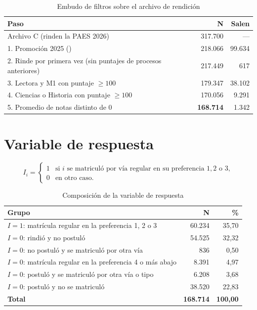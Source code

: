 \documentclass[11pt]{article}
\newif\ifborrador
\newcommand{\redactar}[1]{\ifborrador
  \begin{tcolorbox}[colback=red!4,colframe=red!60!black,fonttitle=\bfseries\small,
    title=Redactar (lo escribe el grupo),breakable,left=4pt,right=4pt,top=1pt,bottom=1pt]
  \small #1\end{tcolorbox}\fi}
\newcommand{\cod}[1]{\texttt{\detokenize{#1}}}
\begin{document}
\begin{table}[H]
\centering
\caption{Embudo de filtros sobre el archivo de rendición}
\label{tab:embudo}
\begin{tabular}{>{\raggedright}p{8cm} r r}
\toprule
\textbf{Paso} & \textbf{N} & \textbf{Salen} \\
\midrule
Archivo C (rinden la PAES 2026) & 317.700 & --- \\
1. Promoción 2025 (\cod{SITUACION_EGRESO == 1}) & 218.066 & 99.634 \\
2. Rinde por primera vez (sin puntajes de procesos anteriores) & 217.449 & 617 \\
3. Lectora y M1 con puntaje $\geq 100$ & 179.347 & 38.102 \\
4. Ciencias o Historia con puntaje $\geq 100$ & 170.056 & 9.291 \\
5. Promedio de notas distinto de 0 & \textbf{168.714} & 1.342 \\
\bottomrule
\end{tabular}
\end{table}

\section{Variable de respuesta}

\redactar{Definir $I$ con palabras y en fórmula: $I = 1$ si el estudiante se matriculó por vía regular (vía 1, tipo 1) en su 1.ª, 2.ª o 3.ª preferencia; $I = 0$ en cualquier otro caso. Comentar la tasa (35,70 \%) y la composición de los ceros (tabla \ref{tab:comp}). Mencionar el chequeo: ningún $I = 1$ tiene \cod{flag_postula = 0}.}

\[
I_i =
\begin{cases}
1 & \text{si } i \text{ se matriculó por vía regular en su preferencia } 1, 2 \text{ o } 3,\\
0 & \text{en otro caso.}
\end{cases}
\]

\begin{table}[H]
\centering
\caption{Composición de la variable de respuesta}
\label{tab:comp}
\begin{tabular}{>{\raggedright}p{9cm} r r}
\toprule
\textbf{Grupo} & \textbf{N} & \textbf{\%} \\
\midrule
$I = 1$: matrícula regular en la preferencia 1, 2 o 3 & 60.234 & 35,70 \\
\midrule
$I = 0$: rindió y no postuló & 54.525 & 32,32 \\
$I = 0$: no postuló y se matriculó por otra vía & 836 & 0,50 \\
$I = 0$: matrícula regular en la preferencia 4 o más abajo & 8.391 & 4,97 \\
$I = 0$: postuló y se matriculó por otra vía o tipo & 6.208 & 3,68 \\
$I = 0$: postuló y no se matriculó & 38.520 & 22,83 \\
\midrule
\textbf{Total} & \textbf{168.714} & \textbf{100,00} \\
\bottomrule
\end{tabular}
\end{table}
\end{document}
